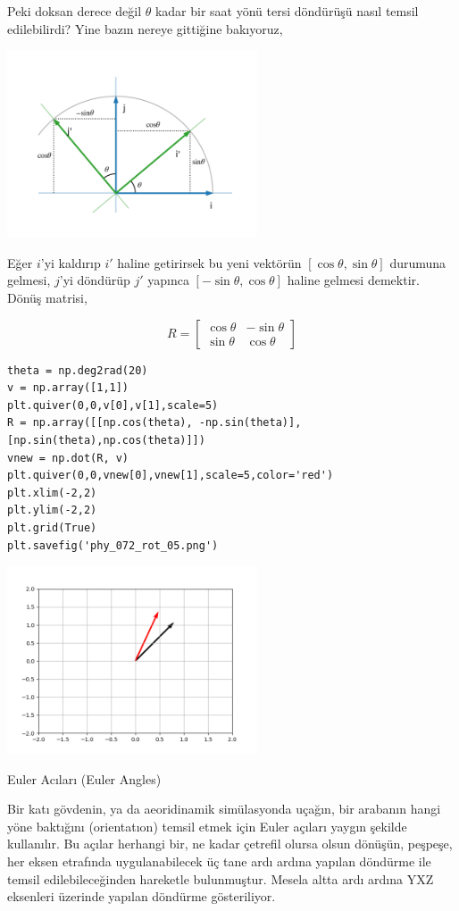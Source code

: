 \documentclass[12pt,fleqn]{article}\usepackage{../../common}
\begin{document}
Peki doksan derece değil $\theta$ kadar bir saat yönü tersi döndürüşü
nasıl temsil edilebilirdi? Yine bazın nereye gittiğine bakıyoruz,

\includegraphics[width=20em]{phy_072_rot_03.png}

Eğer $i$'yi kaldırıp $i'$ haline getirirsek bu yeni vektörün
$[\cos\theta,\sin\theta]$ durumuna gelmesi, $j$'yi döndürüp $j'$ yapınca
$[-\sin\theta,\cos\theta]$ haline gelmesi demektir. Dönüş matrisi,

$$
R = \left[\begin{array}{rr}
\cos\theta & -\sin\theta \\
\sin\theta & \cos\theta
\end{array}\right]
$$

\begin{verbatim}
theta = np.deg2rad(20)
v = np.array([1,1])
plt.quiver(0,0,v[0],v[1],scale=5)
R = np.array([[np.cos(theta), -np.sin(theta)],[np.sin(theta),np.cos(theta)]])
vnew = np.dot(R, v)
plt.quiver(0,0,vnew[0],vnew[1],scale=5,color='red')
plt.xlim(-2,2)
plt.ylim(-2,2)
plt.grid(True)
plt.savefig('phy_072_rot_05.png')
\end{verbatim}

\includegraphics[width=20em]{phy_072_rot_05.png}

Euler Acıları (Euler Angles)

Bir katı gövdenin, ya da aeoridinamik simülasyonda uçağın, bir arabanın hangi
yöne baktığını (orientatıon) temsil etmek için Euler açıları yaygın şekilde
kullanılır. Bu açılar herhangi bir, ne kadar çetrefil olursa olsun dönüşün,
peşpeşe, her eksen etrafında uygulanabilecek üç tane ardı ardına yapılan
döndürme  ile temsil edilebileceğinden hareketle bulunmuştur. Mesela altta
ardı ardına YXZ eksenleri üzerinde yapılan döndürme gösteriliyor.
\end{document}
